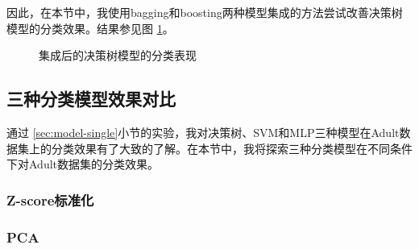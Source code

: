 \documentclass[12pt,a4paper]{article}
\theoremstyle{definition}
\begin{document}
\vspace{0.01\linewidth}
因此，在本节中，我使用bagging和boosting两种模型集成的方法尝试改善决策树模型的分类效果。结果参见图 \ref{fig:model-plus}。

\begin{figure}[H]
	\centering
	\caption{集成后的决策树模型的分类表现}
	\label{fig:model-plus}
\end{figure}

\subsection{三种分类模型效果对比}
\label{sec:compare}

通过 \ref{sec:model-single}小节的实验，我对决策树、SVM和MLP三种模型在Adult数据集上的分类效果有了大致的了解。在本节中，我将探索三种分类模型在不同条件下对Adult数据集的分类效果。

\subsubsection{Z-score标准化}

\subsubsection{PCA}
\end{document}
